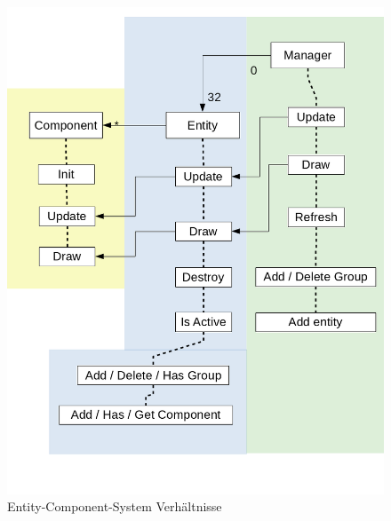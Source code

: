 \documentclass[
  10pt,
  a4paper,
  oneside,
  headers,
  headinclude,
  footinclude,
  BCOR5mm,
]{article}
\begin{document}
\begin{figure}[h]
  \centering
  \includegraphics[scale=0.25]{Scheme}
  \caption{Entity-Component-System Verhältnisse}
  \label{fig:ECS}
\end{figure}
\end{document}
